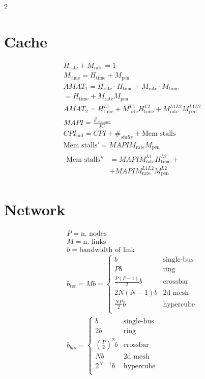 \documentclass[a4paper,12pt]{article}
\begin{document}
\begin{multicols*}{2}
  \section{Cache}
  {\large\begin{gather*}
    H_\text{rate} + M_\text{rate} = 1 \\
    M_\text{time} = H_\text{time} + M_\text{pen} \\
    \mathit{AMAT}_1 = H_\text{rate}\cdot H_\text{time} + M_\text{rate}\cdot M_\text{time} \\
                                 = H_\text{time} + M_\text{rate}M_\text{pen} \\
    \mathit{AMAT}_2 = H_\text{time}^{L1} + M_\text{rate}^{L1}H_\text{time}^{L2} + M_\text{rate}^{L1L2}M_\text{pen}^{L1L2} \\
    \mathit{MAPI} = \frac{\#_{mem acc}}{\mathit{IC}} \\
    \mathit{CPI}_{\text{full}} = \mathit{CPI} + \#_\mathit{stalls} + \text{Mem stalls} \\
    \text{Mem stalls}' = \mathit{MAPI} M_\text{rate} M_\text{pen} \\
    \begin{aligned}
      \text{Mem stalls}'' &= \mathit{MAPI} M_\text{rate}^{L1} H_\text{time}^{L2} + \\
                          &+ \mathit{MAPI} M_\text{rate}^{L1L2} M_\text{pen}^{L2}
    \end{aligned}
  \end{gather*}}

  \section{Network}
  {\large\begin{gather*}
    P = \text{n.\ nodes} \\
    M = \text{n.\ links} \\
    b = \text{bandwidth of link} \\
    b_{tot} = Mb = \begin{cases}
      b  &\text{single-bus} \\
      Pb &\text{ring} \\
      \frac{P(P-1)}{2}b &\text{crossbar} \\
      2N(N-1)b &\text{2d mesh} \\
      \frac{NP}{2}b &\text{hypercube} \\
    \end{cases} \\
    b_{bis} = \begin{cases}
      b  &\text{single-bus} \\
      2b &\text{ring} \\
      {(\frac{P}{2})}^2 b &\text{crossbar}\\
      Nb &\text{2d mesh} \\
      2^{N-1}b &\text{hypercube} \\
    \end{cases} \\
  \end{gather*}}


\end{multicols*}
\end{document}
